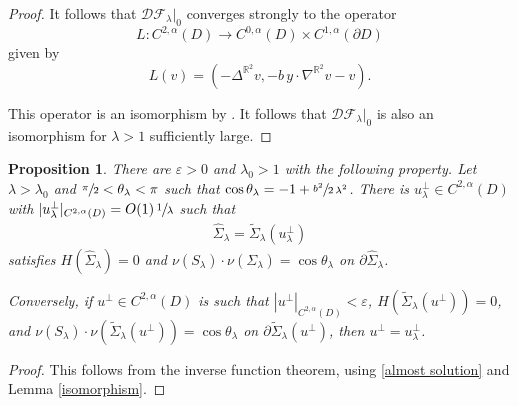 \documentclass[11pt]{amsart}
\newtheorem{prop}{Proposition}
\begin{document}
\begin{proof}
It follows that  $\mathcal{D}\mathcal{F}_\lambda|_{0}$ converges strongly to the operator
$$
L:C^{2,\alpha}(D)\to C^{0,\alpha}(D)\times  C^{1,\alpha}(\partial D)
$$
given by 
$$
L(v)=(-\Delta^{\mathbb{R}^2} v,-b\,y\cdot \nabla^{\mathbb{R}^2}v-v).
$$

This operator is an isomorphism by \cite[Theorem 6.31]{GilbargTrudinger}. 
 It follows that $\mathcal{D}\mathcal{F}_\lambda|_0$ is also an isomorphism for $\lambda>1$ sufficiently large.
 
\end{proof}
\begin{prop} \label{IFT existence}
	There are $\varepsilon>0$ and $\lambda_0>1$ with the following property. Let $\lambda>\lambda_0$ and $\sfrac{\pi}2<\theta_\lambda<\pi$  such that $\cos\theta_\lambda=-1+\sfrac{b^2}{2\,\lambda^2}$. There is  $u_\lambda^\perp \in C^{2,\alpha}(D)$ with $|u_\lambda^\perp|_{C^{2,\alpha}(D)}=O(1)\,\sfrac{1}{\lambda}$  such that 
	\begin{align} \label{Sigma lambda} 
\hat 	\Sigma_\lambda=\tilde \Sigma_\lambda(u_\lambda^\perp)
	\end{align} 
	satisfies $H(\hat \Sigma_\lambda)=0$ and $\nu(S_\lambda)\cdot \nu(\Sigma_\lambda)=\cos\theta_\lambda$  on $ \partial \hat \Sigma_\lambda$.
	
	
	Conversely, if $u^\perp\in C^{2,\alpha}(D)$ is such that $|u^\perp|_{C^{2,\alpha}(D)}<\varepsilon$, $H(\tilde \Sigma_\lambda(u^\perp))=0$, and $\nu(S_\lambda)\cdot \nu(\tilde \Sigma_\lambda(u^\perp))=\cos\theta_\lambda$ on $\partial \tilde \Sigma_\lambda(u^\perp)$,
	then $u^\perp= u_\lambda^\perp$.
\end{prop}
\begin{proof}
	This follows from the inverse function theorem, using \eqref{almost solution} and Lemma \ref{isomorphism}. 
\end{proof}
\end{document}
